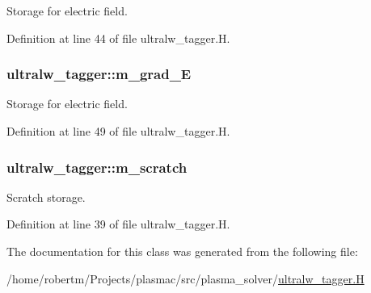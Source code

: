 Storage for electric field. 



Definition at line 44 of file ultralw\+\_\+tagger.\+H.

\subsubsection[{\texorpdfstring{m\+\_\+grad\+\_\+E}{m_grad_E}}]{ ultralw\+\_\+tagger\+::m\+\_\+grad\+\_\+E\hspace{0.3cm}{\ttfamily [protected]}}\hypertarget{classultralw__tagger_a525b4c1b6d58c0d3139f38cffed07fac}{}\label{classultralw__tagger_a525b4c1b6d58c0d3139f38cffed07fac}


Storage for electric field. 



Definition at line 49 of file ultralw\+\_\+tagger.\+H.

\subsubsection[{\texorpdfstring{m\+\_\+scratch}{m_scratch}}]{ ultralw\+\_\+tagger\+::m\+\_\+scratch\hspace{0.3cm}{\ttfamily [protected]}}\hypertarget{classultralw__tagger_a3eb79609d58f9214f49644e75f7ddae2}{}\label{classultralw__tagger_a3eb79609d58f9214f49644e75f7ddae2}


Scratch storage. 



Definition at line 39 of file ultralw\+\_\+tagger.\+H.



The documentation for this class was generated from the following file\+:\begin{DoxyCompactItemize}
\item 
/home/robertm/\+Projects/plasmac/src/plasma\+\_\+solver/\hyperlink{ultralw__tagger_8H}{ultralw\+\_\+tagger.\+H}\end{DoxyCompactItemize}
